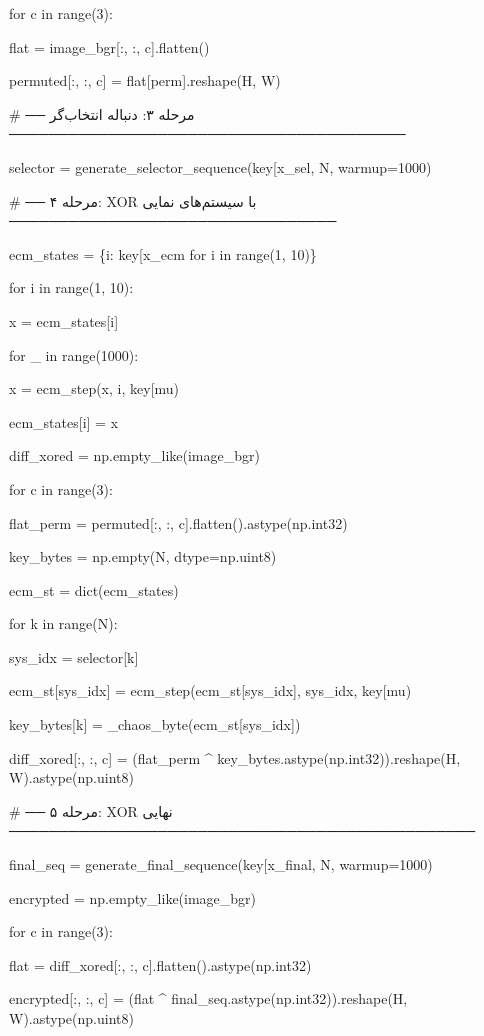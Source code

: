 for c in range(3):

flat = image\_bgr{[}:, :, c{]}.flatten()

permuted{[}:, :, c{]} = flat{[}perm{]}.reshape(H, W)

\# ── مرحله ۳: دنباله انتخاب‌گر ────────────────────────────────────────

selector = generate\_selector\_sequence(key{[}\textquotesingle x\_sel\textquotesingle{]}, N, warmup=1000)

\# ── مرحله ۴: XOR با سیستم‌های نمایی ─────────────────────────────────

ecm\_states = \{i: key{[}\textquotesingle x\_ecm\textquotesingle{]} for i in range(1, 10)\}

for i in range(1, 10):

x = ecm\_states{[}i{]}

for \_ in range(1000):

x = ecm\_step(x, i, key{[}\textquotesingle mu\textquotesingle{]})

ecm\_states{[}i{]} = x

diff\_xored = np.empty\_like(image\_bgr)

for c in range(3):

flat\_perm = permuted{[}:, :, c{]}.flatten().astype(np.int32)

key\_bytes = np.empty(N, dtype=np.uint8)

ecm\_st = dict(ecm\_states)

for k in range(N):

sys\_idx = selector{[}k{]}

ecm\_st{[}sys\_idx{]} = ecm\_step(ecm\_st{[}sys\_idx{]}, sys\_idx, key{[}\textquotesingle mu\textquotesingle{]})

key\_bytes{[}k{]} = \_chaos\_byte(ecm\_st{[}sys\_idx{]})

diff\_xored{[}:, :, c{]} = (flat\_perm \^{} key\_bytes.astype(np.int32)).reshape(H, W).astype(np.uint8)

\# ── مرحله ۵: XOR نهایی ───────────────────────────────────────────────

final\_seq = generate\_final\_sequence(key{[}\textquotesingle x\_final\textquotesingle{]}, N, warmup=1000)

encrypted = np.empty\_like(image\_bgr)

for c in range(3):

flat = diff\_xored{[}:, :, c{]}.flatten().astype(np.int32)

encrypted{[}:, :, c{]} = (flat \^{} final\_seq.astype(np.int32)).reshape(H, W).astype(np.uint8)

